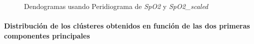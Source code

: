 \begin{figure}[ht]
    \centering
    \hfill
    \caption{Dendogramas usando Peridiograma de \textit{SpO2} y \textit{SpO2\_scaled}}\label{fig:per_den_spo2}
\end{figure}

\paragraph{Distribución de los clústeres obtenidos en función de las dos primeras componentes principales}

